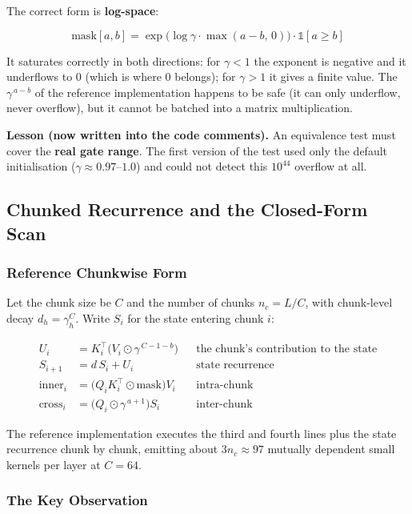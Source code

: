 \documentclass[11pt,openany]{article}
\begin{document}
The correct form is \textbf{log-space}:

\[
\text{mask}[a,b] = \exp\!\big(\log \gamma \cdot \max(a-b,\, 0)\big) \cdot \mathbb{1}[a \ge b]
\]

It saturates correctly in both directions: for $\gamma < 1$ the exponent is negative and
it underflows to $0$ (which is where $0$ belongs); for $\gamma > 1$ it gives a finite
value. The $\gamma^{\,a-b}$ of the reference implementation happens to be safe (it can
only underflow, never overflow), but it cannot be batched into a matrix multiplication.

\begin{notebox}
\textbf{Lesson (now written into the code comments).} An equivalence test must cover the
\textbf{real gate range}. The first version of the test used only the default
initialisation ($\gamma \approx 0.97$--$1.0$) and could not detect this $10^{44}$
overflow at all.
\end{notebox}

\subsection{Chunked Recurrence and the Closed-Form Scan}
\label{sec:en-arch-chunk}

\subsubsection{Reference Chunkwise Form}

Let the chunk size be $C$ and the number of chunks $n_c = L/C$, with chunk-level decay
$d_h = \gamma_h^{C}$. Write $S_i$ for the state entering chunk $i$:

\[
\begin{aligned}
U_i &= K_i^{\top}\big(V_i \odot \gamma^{\,C-1-b}\big)
   &&\text{the chunk's contribution to the state} \\
S_{i+1} &= d\, S_i + U_i &&\text{state recurrence} \\
\text{inner}_i &= \big(Q_i K_i^{\top} \odot \text{mask}\big) V_i &&\text{intra-chunk} \\
\text{cross}_i &= \big(Q_i \odot \gamma^{\,a+1}\big) S_i &&\text{inter-chunk}
\end{aligned}
\]

The reference implementation executes the third and fourth lines plus the state
recurrence chunk by chunk, emitting about $3 n_c \approx 97$ mutually dependent small
kernels per layer at $C = 64$.

\subsubsection{The Key Observation}
\end{document}
